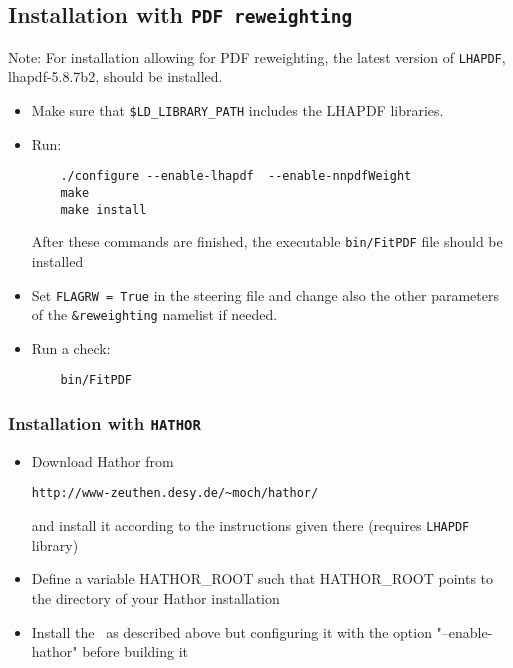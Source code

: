 \subsection{Installation with {\tt PDF reweighting}}\label{sec:install_nnpdfrweight}

Note: For installation allowing for PDF reweighting, the latest version of {\tt LHAPDF}, lhapdf-5.8.7b2, should be installed.

\begin{itemize}
\item Make sure that {\tt \$LD\_LIBRARY\_PATH} includes the LHAPDF libraries.
\item Run:
\begin{verbatim}
    ./configure --enable-lhapdf  --enable-nnpdfWeight
    make 
    make install
\end{verbatim}
After these commands are finished, the executable {\tt bin/FitPDF} 
file should be installed
\item Set {\tt FLAGRW = True} in the steering file and change also the other parameters of the {\tt \&reweighting} namelist if needed.
\item  Run a check:
\begin{verbatim}
    bin/FitPDF 
\end{verbatim}
\end{itemize}


\subsubsection{Installation with {\tt HATHOR}}

 \begin{itemize}
  \item Download Hathor from 
\begin{verbatim}
http://www-zeuthen.desy.de/~moch/hathor/
\end{verbatim}
     and install it according to the instructions given there
     (requires \verb'LHAPDF' library)

  \item Define a variable HATHOR\_ROOT  such that HATHOR\_ROOT  points to the
     directory of your Hathor installation

  \item Install the \fitter\ as described above but configuring it
     with the option "--enable-hathor" before building it
 \end{itemize}



